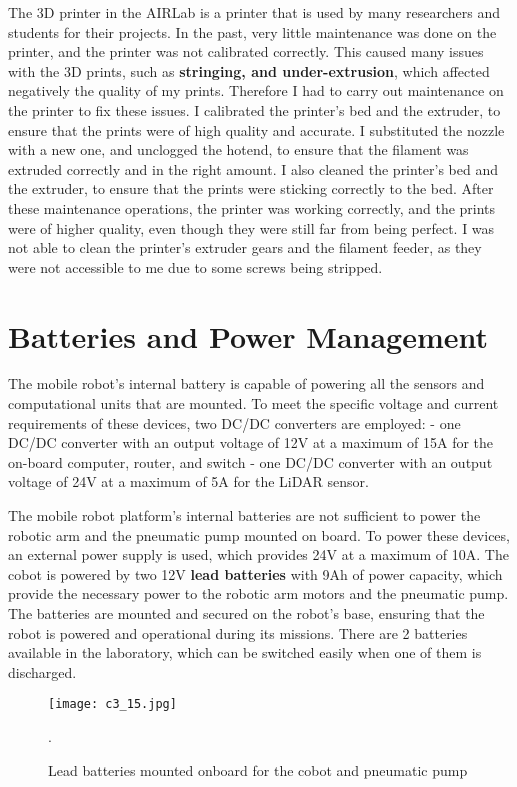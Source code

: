 The 3D printer in the AIRLab is a printer that is used by many researchers and students for their projects.
In the past, very little maintenance was done on the printer, and the printer was not calibrated correctly.
This caused many issues with the 3D prints, such as \textbf{stringing, and under-extrusion}, which affected negatively 
the quality of my prints. Therefore I had to carry out maintenance on the printer to fix these issues.
I calibrated the printer's bed and the extruder, to ensure that the prints were of high quality and accurate.
I substituted the nozzle with a new one, and unclogged the hotend, to ensure that the filament was extruded correctly
and in the right amount. I also cleaned the printer's bed and the extruder, to ensure that the prints were sticking
correctly to the bed. After these maintenance operations, the printer was working correctly, and the prints were of
higher quality, even though they were still far from being perfect. I was not able to clean the printer's
extruder gears and the filament feeder, as they were not accessible to me due to some screws being stripped.

\section{Batteries and Power Management}

The mobile robot's internal battery is capable of powering all the sensors and computational
units that are mounted. To meet the specific voltage and current requirements of these devices, 
two DC/DC converters are employed:
- one DC/DC converter with an output voltage of 12V at a maximum of 15A for the on-board computer, router, and switch
- one DC/DC converter with an output voltage of 24V at a maximum of 5A for the LiDAR sensor.

The mobile robot platform's internal batteries are not sufficient to power the robotic arm and the pneumatic pump
mounted on board. To power these devices, an external power supply is used, which provides 24V at a maximum of 10A.
The cobot is powered by two 12V \textbf{lead batteries} with 9Ah of power capacity, which provide the necessary power 
to the robotic arm motors and the pneumatic pump. The batteries are mounted and secured on the robot's base,
ensuring that the robot is powered and operational during its missions. There are 2 batteries available
in the laboratory, which can be switched easily when one of them is discharged.

\begin{figure}[t]
    \centering
    \texttt{[image: c3\_15.jpg]}
    \captionsetup{width=1\linewidth}
    \caption{Lead batteries mounted onboard for the cobot and pneumatic pump}.
    \label{fig:c3_img15}
\end{figure}

